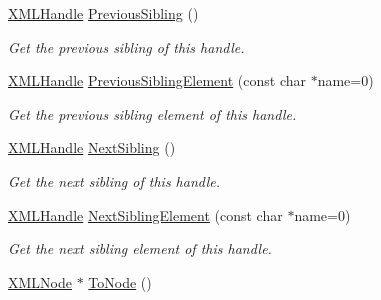 \begin{DoxyCompactItemize}
\mbox{\label{classtinyxml2_1_1_x_m_l_handle_a428374e756f4db4cbc287fec64eae02c}} 
\hyperlink{classtinyxml2_1_1_x_m_l_handle}{X\+M\+L\+Handle} \hyperlink{classtinyxml2_1_1_x_m_l_handle_a428374e756f4db4cbc287fec64eae02c}{Previous\+Sibling} ()
\begin{DoxyCompactList}\small\item\em Get the previous sibling of this handle. \end{DoxyCompactList}\item 
\mbox{\label{classtinyxml2_1_1_x_m_l_handle_a786957e498039554ed334cdc36612a7e}} 
\hyperlink{classtinyxml2_1_1_x_m_l_handle}{X\+M\+L\+Handle} \hyperlink{classtinyxml2_1_1_x_m_l_handle_a786957e498039554ed334cdc36612a7e}{Previous\+Sibling\+Element} (const char $\ast$name=0)
\begin{DoxyCompactList}\small\item\em Get the previous sibling element of this handle. \end{DoxyCompactList}\item 
\mbox{\label{classtinyxml2_1_1_x_m_l_handle_aad2eccc7c7c7b18145877c978c3850b5}} 
\hyperlink{classtinyxml2_1_1_x_m_l_handle}{X\+M\+L\+Handle} \hyperlink{classtinyxml2_1_1_x_m_l_handle_aad2eccc7c7c7b18145877c978c3850b5}{Next\+Sibling} ()
\begin{DoxyCompactList}\small\item\em Get the next sibling of this handle. \end{DoxyCompactList}\item 
\mbox{\label{classtinyxml2_1_1_x_m_l_handle_ae41d88ee061f3c49a081630ff753b2c5}} 
\hyperlink{classtinyxml2_1_1_x_m_l_handle}{X\+M\+L\+Handle} \hyperlink{classtinyxml2_1_1_x_m_l_handle_ae41d88ee061f3c49a081630ff753b2c5}{Next\+Sibling\+Element} (const char $\ast$name=0)
\begin{DoxyCompactList}\small\item\em Get the next sibling element of this handle. \end{DoxyCompactList}\item 
\mbox{\label{classtinyxml2_1_1_x_m_l_handle_a03ea6ec970a021b71bf1219a0f6717df}} 
\hyperlink{classtinyxml2_1_1_x_m_l_node}{X\+M\+L\+Node} $\ast$ \hyperlink{classtinyxml2_1_1_x_m_l_handle_a03ea6ec970a021b71bf1219a0f6717df}{To\+Node} ()

\end{DoxyCompactItemize}
